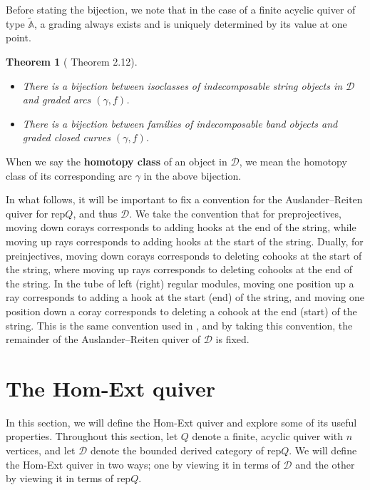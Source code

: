 \documentclass[12pt]{amsart}
\theoremstyle{plain}
\newtheorem{thm}{Theorem}[section]
\theoremstyle{definition}
\theoremstyle{remark}
\begin{document}
Before stating the bijection, we note that in the case of a finite acyclic quiver of type $\tilde{\mathbb{A}}$, a grading always exists and is uniquely determined by its value at one point.

\begin{thm}[\cite{opper2018geometric} Theorem 2.12]
\leavevmode
    \begin{itemize}
        \item There is a bijection between isoclasses of indecomposable string objects in $\mathscr{D}$ and graded arcs $(\gamma,f)$.
        \item There is a bijection between families of indecomposable band objects and graded closed curves $(\gamma,f)$.
    \end{itemize}  
\end{thm}

When we say the {\textbf{homotopy class}} of an object in $\mathscr{D}$, we mean the homotopy class of its corresponding arc $\gamma$ in the above bijection. 

In what follows, it will be important to fix a convention for the Auslander--Reiten quiver for rep$Q$, and thus $\mathscr{D}$. We take the convention that for preprojectives, moving down corays corresponds to adding hooks at the end of the string, while moving up rays corresponds to adding hooks at the start of the string. Dually, for preinjectives, moving down corays corresponds to deleting cohooks at the start of the {\color{black} string}, where moving up rays corresponds to deleting cohooks at the end of the string. In the tube of left (right) regular modules, moving one position up a ray corresponds to adding a hook at the start (end) of the string, and moving one position down a coray corresponds to deleting a cohook at the end (start) of the string. This is the same convention used in {\cite{maresca2022combinatorics}}, and by taking this convention, the remainder of the {\color{black} Auslander--Reiten} quiver of $\mathscr{D}$ is fixed.

\section{The Hom-Ext quiver} \label{sec: H-E quiver}

In this section, we will define the Hom-Ext quiver and explore some of its useful properties. Throughout this section, let $Q$ denote a finite, acyclic quiver with $n$ vertices, {\color{black} and} let $\mathscr{D}$ denote the bounded derived category of rep$Q$. We will define the Hom-Ext quiver in two ways; one by viewing it in terms of $\mathscr{D}$ and the other by viewing it in terms of rep$Q$.
\end{document}

